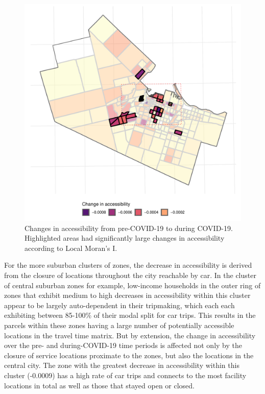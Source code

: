 \documentclass[]{elsarticle} %
\begin{document}
\begin{figure}
\includegraphics[width=1\linewidth]{Accessibility-Foodbanks-Hamilton_files/figure-latex/plot-local-i-1} \caption{\label{fig:accessibility-changes-with-local-i}Changes in accessibility from pre-COVID-19 to during COVID-19. Highlighted areas had significantly large changes in accessibility according to Local Moran's I.}\label{fig:plot-local-i}
\end{figure}

For the more suburban clusters of zones, the decrease in accessibility
is derived from the closure of locations throughout the city reachable
by car. In the cluster of central suburban zones for example, low-income
households in the outer ring of zones that exhibit medium to high
decreases in accessibility within this cluster appear to be largely
auto-dependent in their tripmaking, which each each exhibiting between
85-100\% of their modal split for car trips. This results in the parcels
within these zones having a large number of potentially accessible
locations in the travel time matrix. But by extension, the change in
accessibility over the pre- and during-COVID-19 time periods is affected
not only by the closure of service locations proximate to the zones, but
also the locations in the central city. The zone with the greatest
decrease in accessibility within this cluster (-0.0009) has a high rate
of car trips and connects to the most facility locations in total as
well as those that stayed open or closed.
\end{document}
